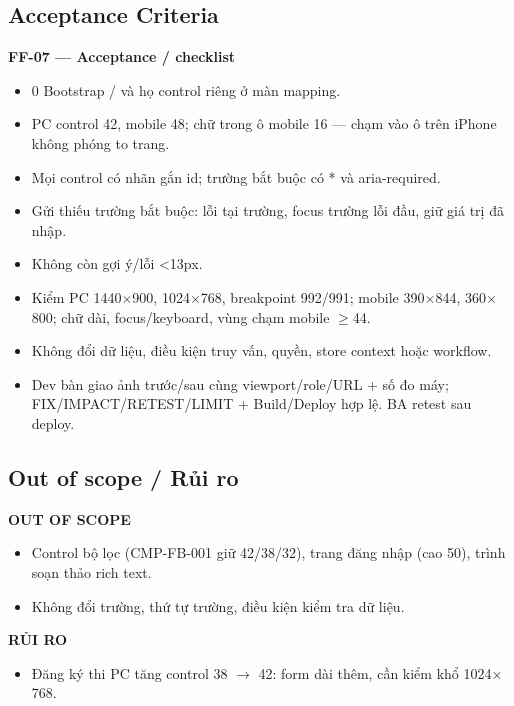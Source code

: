 \documentclass[11pt,a4paper]{report}
\begin{document}
\subsection*{Acceptance Criteria}
\par\smallskip\textbf{FF-07 — Acceptance / checklist}\par
\begin{itemize}[label=$\square$]
\item 0 Bootstrap / và họ control riêng ở màn mapping.
\item PC control 42, mobile 48; chữ trong ô mobile 16 — chạm vào ô trên iPhone không phóng to trang.
\item Mọi control có nhãn gắn id; trường bắt buộc có * và aria-\allowbreak{}required.
\item Gửi thiếu trường bắt buộc: lỗi tại trường, focus trường lỗi đầu, giữ giá trị đã nhập.
\item Không còn gợi ý/\allowbreak{}lỗi \textless{}13px.
\item Kiểm PC 1440\(\times\)900, 1024\(\times\)768, breakpoint 992/\allowbreak{}991; mobile 390\(\times\)844, 360\(\times\)800; chữ dài, focus/\allowbreak{}keyboard, vùng chạm mobile \(\geq\)44.
\item Không đổi dữ liệu, điều kiện truy vấn, quyền, store context hoặc workflow.
\item Dev bàn giao ảnh trước/\allowbreak{}sau cùng viewport/\allowbreak{}role/\allowbreak{}URL + số đo máy; FIX/\allowbreak{}IMPACT/\allowbreak{}RETEST/\allowbreak{}LIMIT + Build/\allowbreak{}Deploy hợp lệ. BA retest sau deploy.
\end{itemize}
\subsection*{Out of scope / Rủi ro}
\par\smallskip\textbf{OUT OF SCOPE}\par
\begin{itemize}
\item Control bộ lọc (CMP-FB-001 giữ 42/\allowbreak{}38/\allowbreak{}32), trang đăng nhập (cao 50), trình soạn thảo rich text.
\item Không đổi trường, thứ tự trường, điều kiện kiểm tra dữ liệu.
\end{itemize}

\par\smallskip\textbf{RỦI RO}\par
\begin{itemize}
\item Đăng ký thi PC tăng control 38 \(\to\) 42: form dài thêm, cần kiểm khổ 1024\(\times\)768.
\end{itemize}
\end{document}
